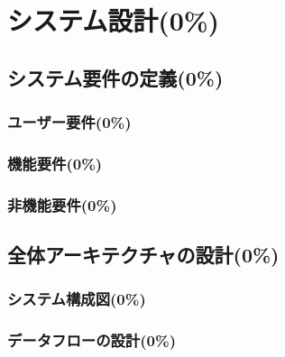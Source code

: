\section{システム設計(0\%)}
  \label{sec:システム設計}
    \par
  
  \subsection{システム要件の定義(0\%)}
    \label{sec:システム要件の定義}
      \par
  
      \subsubsection{ユーザー要件(0\%)}
        \label{sec:ユーザー要件}
          \par
          
      \subsubsection{機能要件(0\%)}
        \label{sec:機能要件}
          \par
          
      \subsubsection{非機能要件(0\%)}
        \label{sec:非機能要件}
          \par
      
  \subsection{全体アーキテクチャの設計(0\%)}
    \label{sec:全体アーキテクチャの設計}
      \par
      
      \subsubsection{システム構成図(0\%)}
        \label{sec:システム構成図}
          \par
          
      \subsubsection{データフローの設計(0\%)}
        \label{sec:データフローの設計}
          \par  
  
